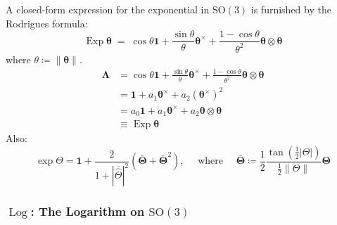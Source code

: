 A closed-form expression for the exponential in \(\mathrm{SO}(3)\) is
furnished by the Rodrigues formula: 
\begin{equation*}
\operatorname{Exp} \bm{\theta} 
\;=\; \cos \theta \mathbf{1} +\frac{\sin \theta}{\theta} \bm{\theta}^{\times} +\frac{1-\cos \theta}{\theta^2} \bm{\theta} \otimes \bm{\theta}
\end{equation*}
where \(\theta \coloneq \|\bm{\theta}\|\).
\begin{equation}
\begin{aligned}
\bm{\Lambda}
&= \cos \theta \mathbf{1} +\frac{\sin \theta}{\theta} \bm{\theta}^{\times} +\frac{1-\cos \theta}{\theta^2} \bm{\theta} \otimes \bm{\theta} \\
&=\mathbf{1}+a_1 \bm{\theta}^{\times} + a_2 \left(\bm{\theta}^{\times}\right)^2 \\
&=a_0 \mathbf{1} + a_1 \bm{\theta}^{\times} + a_2 \bm{\theta}\otimes\bm{\theta} \\
&\equiv \operatorname{Exp} \bm{\theta}
\end{aligned}
\label{eq:ExpSO3}
\end{equation} 
Also:
\begin{equation*}
\exp \Theta=\mathbf{1}+\frac{2}{1+|\overline{\hat{\Theta}}|^2}\left(\bar{\bm{\Theta}}+\bar{\bm{\Theta}}^2\right), 
\quad \text { where } \quad 
\bar{\bm{\Theta}}\coloneq\frac{1}{2} \frac{\tan \left(\frac{1}{2}|\Theta|\right)}{\frac{1}{2}\|\Theta\|} \bm{\Theta}
\end{equation*}
\hypertarget{LogSO3}{%
\subsubsection{\texorpdfstring{\(\operatorname{Log}\): The Logarithm on
\(\mathrm{SO}(3)\)}{Log: The Logarithm on SO(3)}}\label{sec:LogSO3}}

